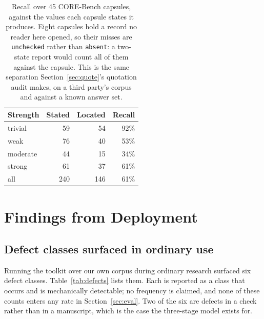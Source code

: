 \documentclass{article}
\newcommand{\code}[1]{\texttt{#1}}
\begin{document}
\begin{table}[h]
\centering
\small
\caption{Recall over 45 CORE-Bench capsules, against the values each capsule states it
produces. Eight capsules hold a record no reader here opened, so their misses are
\code{unchecked} rather than \code{absent}: a two-state report would count all of them against
the capsule. This is the same separation Section~\ref{sec:quote}'s quotation audit makes, on a
third party's corpus and against a known answer set.}
\label{tab:recall}
\begin{tabular}{@{}lrrr@{}}
\toprule
\textbf{Strength} & \textbf{Stated} & \textbf{Located} & \textbf{Recall} \\
\midrule
trivial & 59 & 54 & 92\% \\
weak & 76 & 40 & 53\% \\
moderate & 44 & 15 & 34\% \\
strong & 61 & 37 & 61\% \\
\midrule
all & 240 & 146 & 61\% \\
\bottomrule
\end{tabular}
\end{table}

\section{Findings from Deployment}
\label{sec:failures}

\subsection{Defect classes surfaced in ordinary use}

Running the toolkit over our own corpus during ordinary research surfaced six defect classes.
Table~\ref{tab:defects} lists them. Each is reported as a class that occurs and is mechanically
detectable; no frequency is claimed, and none of these counts enters any rate in
Section~\ref{sec:eval}. Two of the six are defects in a check rather than in a manuscript, which
is the case the three-stage model exists for.
\end{document}
